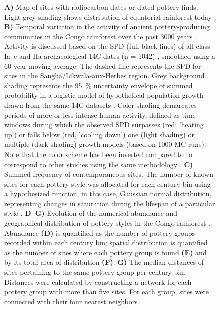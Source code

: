 \documentclass[smallextended,natbib]{svjour3}       %
\begin{document}
\begin{figure}[t!]
	\caption{\textbf{A)} Map of sites with radiocarbon dates or dated pottery finds. Light grey shading shows distribution of equatorial rainforest today \citep{White.1983}. \textbf{B)} Temporal variation in the activity of ancient pottery-producing communities in the Congo rainforest over the past 3000 years \citep[regions A--H in][Fig.~2]{Seidensticker.2021}. Activity is discussed based on the SPD (full black lines) of all class Ia--c and IIa archaeological 14C dates (n = 1042) \citep{Seidensticker.2021f}, smoothed using a 60-year moving average. The dashed line represents the SPD for sites in the Sangha/Likwala-aux-Herbes region. Grey background shading represents the 95~\% uncertainty envelope of summed probability in a logistic model of hypothetical population growth drawn from the same 14C datasets \citep{Bevan.2022}. Color shading demarcates periods of more or less intense human activity, defined as time windows during which the observed SPD surpasses (red; 'heating up') or falls below (red, 'cooling down') one (light shading) or multiple (dark shading) growth models (based on 1000 MC runs). Note that the color scheme has been inverted compared to \citep[Fig.~2]{Seidensticker.2021} to correspond to other studies using the same methodology \citep{Crema.2016,Bevan.2017,Riris.2018,Riris.2019a,Brown.2019,Arroyo-Kalin.2021,deSouza.2021}. \textbf{C)} Summed frequency of contemporaneous sites. The number of known sites for each pottery style was allocated for each century bin using a hypothesized function, in this case, Gaussian normal distribution, representing changes in saturation during the lifespan of a particular style \citep{Roberts.2012}. \textbf{D--G)} Evolution of the numerical abundance and geographical distribution of pottery styles in the Congo rainforest \citep[Fig.~3]{Seidensticker.2021}. Abundance \textbf{(D)} is quantified as the number of pottery groups recorded within each century bin; spatial distribution is quantified as the number of sites where each pottery group is found \textbf{(E)} and by its total area of distribution \textbf{(F)}. \textbf{G)} The median distances of sites pertaining to the same pottery group per century bin. Distances were calculated by constructing a network for each pottery group with more than five sites. For each group, sites were connected with their four nearest neighbors \citep{bivand2011spdep}.}
\end{figure}
\end{document}
